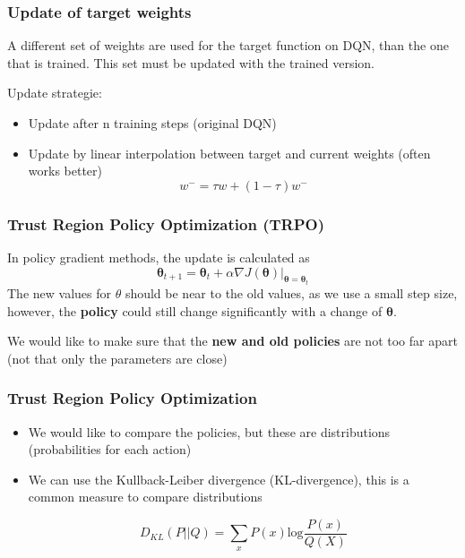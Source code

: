 \subsubsection{Update of target weights}
A different set of weights are used for the target function on DQN, than the one that is trained.
This set must be updated with the trained version.

Update strategie:
\begin{itemize}
    \item Update after n training steps (original DQN)
    \item Update by linear interpolation between target and current weights (often works better)
    \[
    w^- = \tau w + (1-\tau)w^-
    \]
\end{itemize}
\subsubsection{Trust Region Policy Optimization (TRPO)}
In policy gradient methods, the update is calculated as
\[
\boldsymbol{\theta}_{t+1} = \boldsymbol{\theta}_t + \alpha\nabla J(\boldsymbol{\theta})|_{\boldsymbol{\theta} = \boldsymbol{\theta}_t}
\]
The new values for \(\theta\) should be near to the old values, as we use a small step size, however, the \textbf{policy} could still change significantly with a change of \(\boldsymbol{\theta}\).

We would like to make sure that the \textbf{new and old policies} are not too far apart (not that only the parameters are close)
\subsubsection*{Trust Region Policy Optimization}
\begin{itemize}
    \item We would like to compare the policies, but these are distributions (probabilities for each action)
    \item We can use the Kullback-Leiber divergence (KL-divergence), this is a common measure to compare distributions
    
    \[
    D_{KL}(P||Q) = \sum_{x}^{}P(x) \text{log}\frac{P(x)}{Q(X)}
    \]
\end{itemize}

